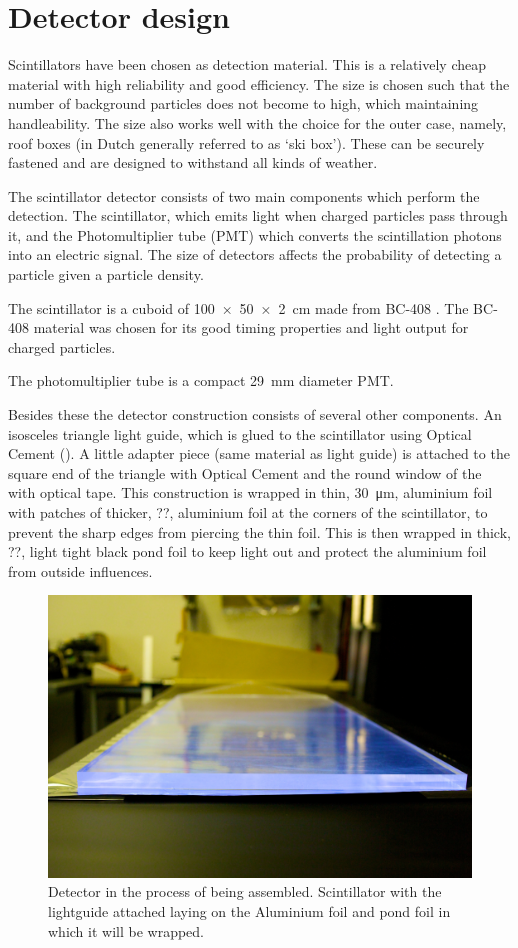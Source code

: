 \section{Detector design}
\label{sec:detector-design}

Scintillators have been chosen as detection material. This is a relatively cheap material with high reliability and good efficiency. The size is chosen such that the number of background particles does not become to high, which maintaining handleability. The size also works well with the choice for the outer case, namely, roof boxes (in Dutch generally referred to as `ski box'). These can be securely fastened and are designed to withstand all kinds of weather.

The scintillator detector consists of two main components which perform the detection. The scintillator, which emits light when charged particles pass through it, and the Photomultiplier tube (PMT) which converts the scintillation photons into an electric signal. The size of detectors affects the probability of detecting a particle given a particle density.

The scintillator is a cuboid of \SI[product-units=power]{100 x 50 x 2}{\centi\meter} made from BC-408 \cite{bc408}. The BC-408 material was chosen for its good timing properties and light output for charged particles.

The photomultiplier tube \cite{et:pmt} is a compact \SI{29}{\milli\meter} diameter PMT.

Besides these the detector construction consists of several other components. An isosceles triangle light guide, which is glued to the scintillator using Optical Cement (\cite{bc600}). A little adapter piece (same material as light guide) is attached to the square end of the triangle with Optical Cement and the round window of the \pmt with optical tape. This construction is wrapped in thin, \SI{30}{\micro\meter}, aluminium foil with patches of thicker, ??, aluminium foil at the corners of the scintillator, to prevent the sharp edges from piercing the thin foil. This is then wrapped in thick, ??, light tight black pond foil to keep light out and protect the aluminium foil from outside influences.

\begin{figure}
    \centering
    \includegraphics[width=.6\textwidth]{plots/experiment/ADL_115651}
    \caption{Detector in the process of being assembled. Scintillator with the lightguide attached laying on the Aluminium foil and pond foil in which it will be wrapped.}
    \label{fig:scintillator}
\end{figure}


